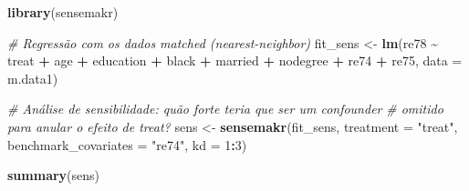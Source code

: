 \documentclass[
]{article}
\newenvironment{Shaded}{\begin{snugshade}}{\end{snugshade}}
\newcommand{\AttributeTok}[1]{\textcolor[rgb]{0.13,0.29,0.53}{#1}}
\newcommand{\CommentTok}[1]{\textcolor[rgb]{0.56,0.35,0.01}{\textit{#1}}}
\newcommand{\DecValTok}[1]{\textcolor[rgb]{0.00,0.00,0.81}{#1}}
\newcommand{\FunctionTok}[1]{\textcolor[rgb]{0.13,0.29,0.53}{\textbf{#1}}}
\newcommand{\NormalTok}[1]{#1}
\newcommand{\OtherTok}[1]{\textcolor[rgb]{0.56,0.35,0.01}{#1}}
\newcommand{\SpecialCharTok}[1]{\textcolor[rgb]{0.81,0.36,0.00}{\textbf{#1}}}
\newcommand{\StringTok}[1]{\textcolor[rgb]{0.31,0.60,0.02}{#1}}
\begin{document}
\begin{Shaded}
\begin{Highlighting}[]
\FunctionTok{library}\NormalTok{(sensemakr)}

\CommentTok{\# Regressão com os dados matched (nearest{-}neighbor)}
\NormalTok{fit\_sens }\OtherTok{\textless{}{-}} \FunctionTok{lm}\NormalTok{(re78 }\SpecialCharTok{\textasciitilde{}}\NormalTok{ treat }\SpecialCharTok{+}\NormalTok{ age }\SpecialCharTok{+}\NormalTok{ education }\SpecialCharTok{+}\NormalTok{ black }\SpecialCharTok{+}\NormalTok{ married }\SpecialCharTok{+}
\NormalTok{                 nodegree }\SpecialCharTok{+}\NormalTok{ re74 }\SpecialCharTok{+}\NormalTok{ re75,}
               \AttributeTok{data =}\NormalTok{ m.data1)}

\CommentTok{\# Análise de sensibilidade: quão forte teria que ser um confounder}
\CommentTok{\# omitido para anular o efeito de treat?}
\NormalTok{sens }\OtherTok{\textless{}{-}} \FunctionTok{sensemakr}\NormalTok{(fit\_sens,}
                  \AttributeTok{treatment =} \StringTok{"treat"}\NormalTok{,}
                  \AttributeTok{benchmark\_covariates =} \StringTok{"re74"}\NormalTok{,}
                  \AttributeTok{kd =} \DecValTok{1}\SpecialCharTok{:}\DecValTok{3}\NormalTok{)}

\FunctionTok{summary}\NormalTok{(sens)}
\end{Highlighting}
\end{Shaded}
\end{document}
